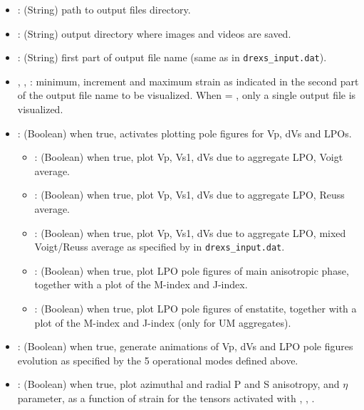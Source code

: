 \begin{itemize}
    \item {}: (String) path to \drexstitle{} output files directory.
    \item {}: (String) output directory where images and videos are saved.
    \item {}: (String) first part of output file name (same as  in \texttt{drexs\_input.dat}).
    \item {}, , : minimum, increment and maximum strain as indicated in the second part of the output file name to be visualized. When  = , only a single output file is visualized.
    \item {}:  (Boolean) when true, activates plotting pole figures for Vp, dVs and LPOs. 
    
    \begin{itemize}
        \item {}:  (Boolean) when true, plot Vp, Vs1, dVs due to aggregate LPO, Voigt average.
        \item {}:  (Boolean) when true, plot Vp, Vs1, dVs due to aggregate LPO, Reuss average.
        \item {}:  (Boolean) when true, plot Vp, Vs1, dVs due to aggregate LPO, mixed Voigt/Reuss average as specified by  in \texttt{drexs\_input.dat}.
        \item {}: (Boolean) when true, plot LPO pole figures of main anisotropic phase, together with a plot of the M-index and J-index.
        \item {}: (Boolean) when true, plot LPO pole figures of enstatite, together with a plot of the M-index and J-index (only for UM aggregates).
    \end{itemize} 
    
    \item {}: (Boolean) when true, generate animations of Vp, dVs and LPO pole figures evolution as specified by the 5  operational modes defined above. 
    
    \item {}: (Boolean) when true, plot azimuthal and radial P and S anisotropy, and $\eta$ parameter, as a function of strain for the tensors activated with , , .


\end{itemize}
